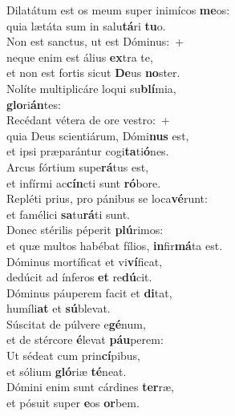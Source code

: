 \evenverse Dilatátum est os meum super inimícos \textbf{me}os:~\*\\
\evenverse quia lætáta sum in salu\textbf{tá}ri \textbf{tu}o.\\
\oddverse Non est sanctus, ut est Dóminus:~+\\
\oddverse  neque enim est álius \textbf{ex}tra te,~\*\\
\oddverse et non est fortis sicut \textbf{De}us \textbf{no}ster.\\
\evenverse Nolíte multiplicáre loqui su\textbf{blí}mia,~\*\\
\evenverse \textbf{glo}ri\textbf{án}tes:\\
\oddverse Recédant vétera de ore vestro:~+\\
\oddverse  quia Deus scientiárum, Dómi\textbf{nus} est,~\*\\
\oddverse et ipsi præparántur cogi\textbf{ta}ti\textbf{ó}nes.\\
\evenverse Arcus fórtium supe\textbf{rá}tus est,~\*\\
\evenverse et infírmi ac\textbf{cín}cti sunt \textbf{ró}bore.\\
\oddverse Repléti prius, pro pánibus se loca\textbf{vé}runt:~\*\\
\oddverse et famélici \textbf{sa}tu\textbf{rá}ti sunt.\\
\evenverse Donec stérilis péperit \textbf{plú}rimos:~\*\\
\evenverse et quæ multos habébat fílios, \textbf{in}fir\textbf{má}ta est.\\
\oddverse Dóminus mortíficat et vi\textbf{ví}ficat,~\*\\
\oddverse dedúcit ad ínferos \textbf{et} re\textbf{dú}cit.\\
\evenverse Dóminus páuperem facit et \textbf{di}tat,~\*\\
\evenverse humíli\textbf{at} et \textbf{sú}blevat.\\
\oddverse Súscitat de púlvere e\textbf{gé}num,~\*\\
\oddverse et de stércore \textbf{é}levat \textbf{páu}perem:\\
\evenverse Ut sédeat cum prin\textbf{cí}pibus,~\*\\
\evenverse et sólium \textbf{gló}riæ \textbf{té}neat.\\
\oddverse Dómini enim sunt cárdines \textbf{ter}ræ,~\*\\
\oddverse et pósuit super \textbf{e}os \textbf{or}bem.\\
